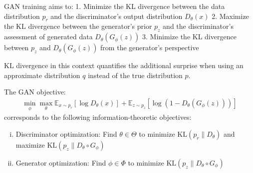 GAN training aims to:
1. Minimize the KL divergence between the data distribution $p_r$ and the discriminator's output distribution $D_\theta(x)$
2. Maximize the KL divergence between the generator's prior $p_z$ and the discriminator's assessment of generated data $D_\theta(G_\phi(z))$
3. Minimize the KL divergence between $p_z$ and $D_\theta(G_\phi(z))$ from the generator's perspective

\begin{remark}
	KL divergence in this context quantifies the additional surprise when using an approximate distribution $q$ instead of the true distribution $p$.
\end{remark}

\begin{proposition}%
	\label{thm:info-objective}%
	The GAN objective:
	\begin{align}
		\label{eq:gan-objective}
		\min_\phi \max_\theta \mathbb{E}_{x \sim p_r}[\log D_\theta(x)] + \mathbb{E}_{z \sim p_z}[\log(1 - D_\theta(G_\phi(z)))]
	\end{align}
	corresponds to the following information-theoretic objectives:
	\begin{enumerate}[(i)]
		\item Discriminator optimization: Find $\theta \in \Theta$ to minimize $\text{KL}(p_r \| D_\theta)$ and maximize $\text{KL}(p_z \| D_\theta \circ G_\phi)$
		\item Generator optimization: Find $\phi \in \Phi$ to minimize $\text{KL}(p_z \| D_\theta \circ G_\phi)$
	\end{enumerate}
\end{proposition}

